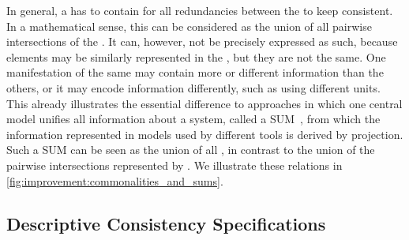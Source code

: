 In general, a \conceptmetamodel has to contain \commonalities for all redundancies between the \concretemetamodels to keep consistent.
In a mathematical sense, this can be considered as the union of all pairwise intersections of the \concretemetamodels.
It can, however, not be precisely expressed as such, because elements may be similarly represented in the \concretemetamodels, but they are not the same.
One manifestation of the same \commonality may contain more or different information than the others, or it may encode information differently, such as using different units.
This already illustrates the essential difference to approaches in which one central model unifies all information about a system, called a \gls{SUM}~\cite{atkinson2010a}, from which the information represented in models used by different tools is derived by projection.
Such a \gls{SUM} can be seen as the union of all \concretemetamodels, in contrast to the union of the pairwise intersections represented by \concretemetamodels.
We illustrate these relations in \autoref{fig:improvement:commonalities_and_sums}.


\subsection{Descriptive Consistency Specifications}







